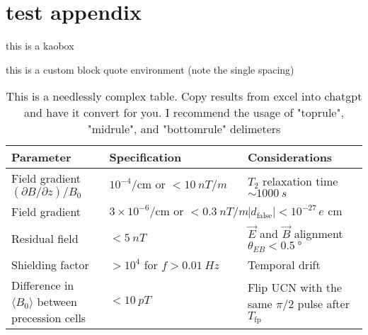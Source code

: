 \chapter{test appendix}
\label{appx:test-appendix}


\begin{kaobox}[frametitle=box title]
    this is a kaobox
\end{kaobox}

\lipsum[75]
\begin{displayquote}
    this is a custom block quote environment (note the single spacing)

    \lipsum[2]
\end{displayquote}
\lipsum[75]

\begin{table}
\renewcommand*{\arraystretch}{2} %
\centering
\begin{tabular}{
    lll
}
\toprule
Parameter		& Specification				& Considerations	\\
\midrule
Field gradient $(\partial B/\partial z)/B_0$	& $10^{-4}/\text{cm or } <\qty{10}{nT\per m}$ & $T_2$ relaxation time $\sim\qty{1000}{s}$\\
Field gradient  & $3\times 10^{-6}/\text{cm or }<\qty{0.3}{nT\per m}$ & $|d_\text{false}|<10^{-27}\,e\text{ cm}$ \\
Residual field & $<\qty{5}{nT}$ & $\vec{E}$ and $\vec{B}$ alignment $\theta_{EB}<\qty{0.5}{\degree}$ \\
Shielding factor & $>10^4$ for $f>\qty{0.01}{Hz}$ & Temporal drift \\
\makecell[l]{Difference in $\langle B_0 \rangle$\\between precession cells} & $<\qty{10}{pT}$ & \makecell[l]{Flip UCN with the same $\pi/2$\\pulse after $T_\text{fp}$} \\
\bottomrule
\end{tabular}
\caption[caption for list of tables here]
{This is a needlessly complex table. Copy results from excel into chatgpt and have it convert for you. I recommend the usage of "toprule", "midrule", and "bottomrule" delimeters}\label{tab:example}
\end{table}

\blinddocument